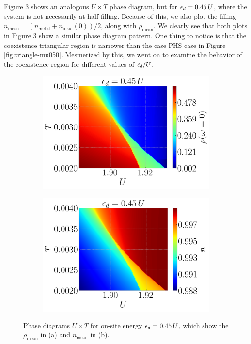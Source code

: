 \documentclass[12pt]{report}
\begin{document}
Figure \ref{fig:mu045} shows an analogous $U \times T$ phase diagram, but for $\epsilon_d = 0.45 \, U$, where the system is not necessarily at half-filling. Because of this, we also plot the filling $n_{\text{mean}} = (n_{\text{metal}} + n_{\text{insul}}(0))/2$, along with $\rho_{\text{mean}}$. We clearly see that both plots in Figure \ref{fig:mu045} show a similar phase diagram pattern. One thing to notice is that the coexistence triangular region is narrower than the case PHS case in Figure \ref{fig:triangle-mu050}. Mesmerized by this, we went on to examine the behavior of the coexistence region for different values of $\epsilon_d/U$.

\begin{figure}[H]
\centering
\begin{subfigure}{.40\textwidth}
  \centering
  \includegraphics[width=\linewidth]{fig/dmft/mean2_0-mu045.png}
  \caption{}
  \label{fig:mu045-rho0}
\end{subfigure}%
\hfill
\begin{subfigure}{.40\textwidth}
  \centering
  \includegraphics[width=\linewidth]{fig/dmft/mean2_n-mu045.png}
  \caption{}
  \label{fig:mu045-n}
\end{subfigure}
\caption{Phase diagrams $U \times T$ for on-site energy $\epsilon_d = 0.45 \, U$, which show the $\rho_{\text{mean}}$ in (a) and $n_{\text{mean}}$ in (b).}
\label{fig:mu045}
\end{figure}
\end{document}
